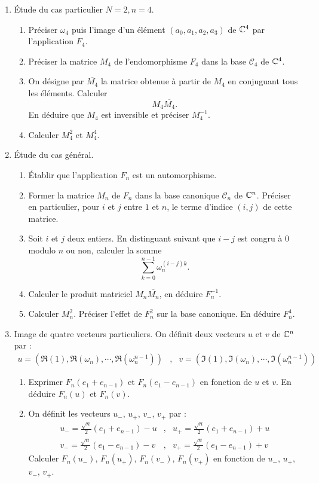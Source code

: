 \begin{enumerate}
 \item \'Etude du cas particulier $N=2, n=4$.
 \begin{enumerate}
 \item Préciser $\omega_4$ puis l'image d'un élément $(a_0,a_1,a_2,a_3)$ de $\mathbb{C}^4$ par l'application $F_4$.
\item Préciser la matrice $M_4$ de l'endomorphisme $F_4$ dans la base $\mathcal C _4$ de $\mathbb{C}^4$. 
\item On désigne par $\overline{M_4}$ la matrice obtenue à partir de $M_4$ en conjuguant tous les éléments. Calculer
\begin{displaymath}
 M_4 \overline{M_4}.
\end{displaymath}
En déduire que $M_4$ est inversible et préciser $M_4^{-1}$.
\item Calculer $M_4^2$ et $M_4^4$.
\end{enumerate}
\item \'Etude du cas général.
\begin{enumerate}
 \item \'Etablir que l'application $F_n$ est un automorphisme.
\item Former la matrice $M_n$ de $F_n$ dans la base canonique $\mathcal C _n$ de $\mathbb{C}^n$. Préciser en particulier, pour $i$ et $j$ entre $1$ et $n$, le terme d'indice $(i,j)$ de cette matrice.
\item Soit $i$ et $j$ deux entiers. En distinguant suivant que $i-j$ est congru à $0$ modulo $n$ ou non, calculer la somme
\begin{displaymath}
 \sum_{k=0}^{n-1} \omega_n^{(i-j)k}.
\end{displaymath}
\item Calculer le produit matriciel $ M_n \overline{M_n}$, en déduire $F_n^{-1}$.
\item Calculer $M_n^2$. Préciser l'effet de $F_n^2$ sur la base canonique. En déduire $F_n^4$.
\end{enumerate}

\item Image de quatre vecteurs particuliers.\newline
On définit deux vecteurs $u$ et $v$ de $\mathbb{C}^n$ par :
\begin{align*}
 u=(\Re(1),\Re(\omega_n),\cdots , \Re(\omega_n^{n-1})) &,& v=(\Im(1),\Im(\omega_n),\cdots , \Im(\omega_n^{n-1}))
\end{align*}
\begin{enumerate}
 \item Exprimer $F_n(e_1 + e_{n-1})$ et $F_n(e_1 - e_{n-1})$ en fonction de $u$ et $v$. En déduire $F_n(u)$ et $F_n(v)$.
\item On définit les vecteurs $u_-$, $u_+$, $v_-$, $v_+$ par :
\begin{align*}
 u_- = \frac{\sqrt{n}}{2}(e_1+e_{n-1}) - u &,& u_+ = \frac{\sqrt{n}}{2}(e_1+e_{n-1}) + u \\ 
 v_- = \frac{\sqrt{n}}{2}(e_1-e_{n-1}) - v &,& v_+ = \frac{\sqrt{n}}{2}(e_1-e_{n-1}) + v
\end{align*}
Calculer $F_n(u_-)$, $F_n(u_+)$, $F_n(v_-)$, $F_n(v_+)$ en fonction de $u_-$, $u_+$, $v_-$, $v_+$.
\end{enumerate}


\end{enumerate}
